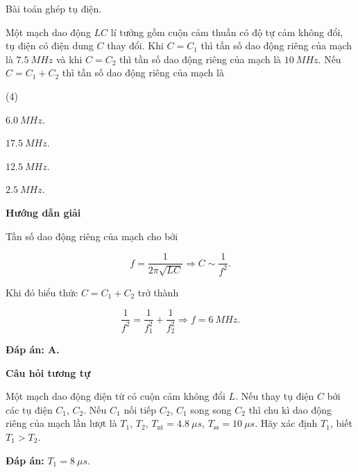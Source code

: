 \begin{dang}{Bài toán ghép tụ điện.}
{		Một mạch dao động $LC$ lí tưởng gồm cuộn cảm thuần có độ tự cảm không đổi, tụ điện có điện dung $C$ thay đổi. Khi $C = C_1$ thì tần số dao động riêng của mạch là $\SI{7,5}{MHz}$ và khi $C = C_2$ thì tần số dao động riêng của mạch là $\SI{10}{MHz}$. Nếu $C = C_1 + C_2$ thì tần số dao động riêng của mạch là
		\begin{mcq}(4)
			\item $\SI{6,0}{MHz}$. 
			\item $\SI{17,5}{MHz}$. 
			\item $\SI{12,5}{MHz}$. 
			\item $\SI{2,5}{MHz}$. 
		\end{mcq}
		
	}
	{	\begin{center}
			\textbf{Hướng dẫn giải}
		\end{center}
		
		Tần số dao động riêng của mạch cho bởi
		
		$$f=\dfrac{1}{2 \pi \sqrt{L C}} \Rightarrow C \sim \dfrac{1}{f^{2}}.$$
		
		Khi đó biểu thức $C=C_{1}+C_{2}$ trở thành
		
		$$\dfrac{1}{f^{2}}=\dfrac{1}{f_{1}^{2}}+\dfrac{1}{f_{2}^{2}} \Rightarrow  f = \SI{6}{MHz}.$$
		
		\textbf{Đáp án: A.}
		
		\begin{center}
			\textbf{Câu hỏi tương tự}
		\end{center}
		
		Một mạch dao động điện từ có cuộn cảm không đổi $L$. Nếu thay tụ điện $C$ bởi các tụ điện $C_1$, $C_2$. Nếu $C_1$ nối tiếp $C_2$, $C_1$ song song $C_2$ thì chu kì dao động riêng của mạch lần lượt là $T_1$, $T_2$, $T_\text{nt} = \SI{4,8}{\mu s}$, $T_\text{ss} = \SI{10}{\mu s}$. Hãy xác định $T_1$, biết $T_1 >T_2$.
		
		\textbf{Đáp án:} $T_1 = \SI{8}{\mu s}$.
	}

\end{dang}
